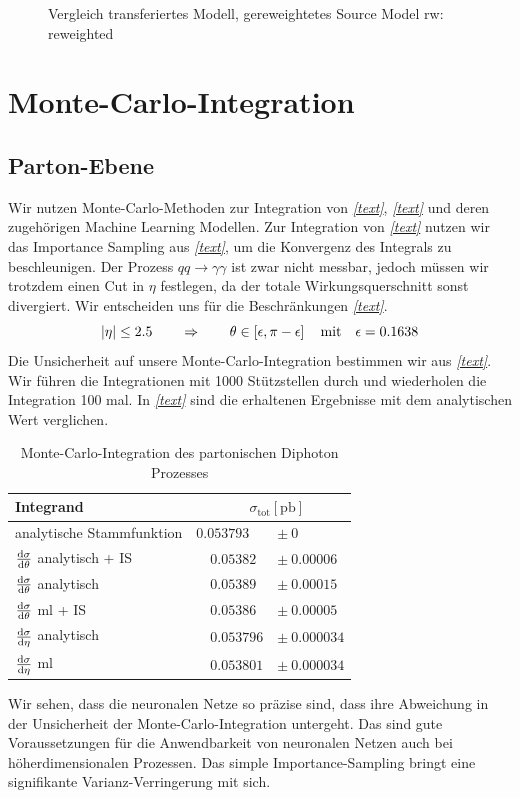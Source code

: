 \begin{figure}[tbp]
	\caption{Vergleich transferiertes Modell, gereweightetes Source Model
		rw: reweighted}
\end{figure}
\section{Monte-Carlo-Integration}
\subsection{Parton-Ebene}
Wir nutzen Monte-Carlo-Methoden zur Integration von \textit{\autoref{text}}, \textit{\autoref{text}} und deren zugehörigen Machine Learning Modellen. Zur Integration von \textit{\autoref{text}} nutzen wir das Importance Sampling aus \textit{\autoref{text}}, um die Konvergenz des Integrals zu beschleunigen. Der Prozess $qq \rightarrow \gamma \gamma$ ist zwar nicht messbar, jedoch müssen wir trotzdem einen Cut in $\eta$ festlegen, da der totale Wirkungsquerschnitt sonst divergiert. Wir entscheiden uns für die Beschränkungen \textit{\autoref{text}}.
\begin{equation}
\abs{\eta} \leq 2.5 \qquad \Rightarrow \qquad \theta \in \left[\epsilon, \pi - \epsilon \right] \quad \text{mit} \quad \epsilon = 0.1638
\end{equation}
Die Unsicherheit auf unsere Monte-Carlo-Integration bestimmen wir aus \textit{\autoref{text}}. Wir führen die Integrationen mit 1000 Stützstellen durch und wiederholen die Integration 100 mal. In \textit{\autoref{text}} sind die erhaltenen Ergebnisse mit dem analytischen Wert verglichen.
\begin{table}[bh]
	\centering
	\begin{tabular}{lll}
		Integrand & \multicolumn{2}{c}{$\quad \sigma_{\text{tot}}[\text{pb}]$} \\
		\hline
		analytische Stammfunktion& \quad  $0.053793$ &$\pm~ 0$\\
		$\derivative{\sigma}{\theta}$ analytisch + IS & $\quad 0.05382 $&$\pm~ 0.00006 $ \\
		$\derivative{\sigma}{\theta}$ analytisch & $\quad 0.05389$ &$\pm~ 0.00015 $ \\
		$\derivative{\sigma}{\theta}$ ml + IS &$\quad 0.05386$ &$\pm~ 0.00005$ \\
		$\derivative{\sigma}{\eta}$ analytisch & $\quad 0.053796 $&$\pm~ 0.000034$ \\
		$\derivative{\sigma}{\eta}$ ml & $\quad 0.053801 $&$\pm~ 0.000034$ \\
	\end{tabular}
	\caption{Monte-Carlo-Integration des partonischen Diphoton Prozesses}
\end{table}
Wir sehen, dass die neuronalen Netze so präzise sind, dass ihre Abweichung in der Unsicherheit der Monte-Carlo-Integration untergeht. Das sind gute Voraussetzungen für die Anwendbarkeit von neuronalen Netzen auch bei höherdimensionalen Prozessen. Das simple Importance-Sampling bringt eine signifikante Varianz-Verringerung mit sich.
